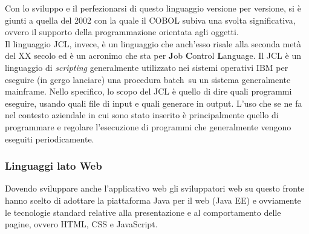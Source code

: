 	Con lo sviluppo e il perfezionarsi di questo linguaggio versione per versione, si è giunti a quella del 2002 con la quale il COBOL subiva una svolta significativa, ovvero il supporto della programmazione orientata agli oggetti.\\
	 
	Il linguaggio JCL, invece, è un linguaggio che anch'esso risale alla seconda metà del XX secolo ed è un acronimo che sta per \textbf{J}ob \textbf{C}ontrol \textbf{L}anguage. Il JCL è un linguaggio di \textit{scripting} generalmente utilizzato nei sistemi operativi IBM per eseguire (in gergo lanciare) una procedura batch\glossario\ su un sistema generalmente mainframe. Nello specifico, lo scopo del JCL è quello di dire quali programmi eseguire, usando quali file di input e quali generare in output. L'uso che se ne fa nel contesto aziendale in cui sono stato inserito è principalmente quello di programmare e regolare l'esecuzione di programmi che generalmente vengono eseguiti periodicamente.

	\subsubsection{Linguaggi lato Web}

	Dovendo sviluppare anche l'applicativo web gli sviluppatori web su questo
fronte hanno scelto di adottare la piattaforma Java per il web (Java EE) e ovviamente le tecnologie standard relative alla presentazione e al comportamento delle pagine, ovvero HTML, CSS e JavaScript.\\

